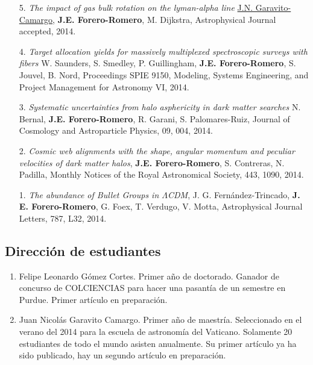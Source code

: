 \documentclass{article}
\begin{document}
\begin{enumerate}
\item[5.]{\it The impact of gas bulk rotation on the lyman-alpha line}
  \underline{J.N. Garavito-Camargo},  {\bf J.E. Forero-Romero}, M. Dijkstra,
  Astrophysical Journal
  accepted, 2014. 

\item[4.]{\it } {\it Target allocation yields for massively
  multiplexed spectroscopic surveys with fibers} W. Saunders,
  S. Smedley, P. Guillingham, {\bf J.E. Forero-Romero}, S. Jouvel,
  B. Nord, Proceedings SPIE 9150, Modeling, Systems Engineering, and
  Project Management for Astronomy VI, 2014.

\item[3.]{\it Systematic uncertainties from halo asphericity in dark
  matter searches}  N. Bernal, {\bf J.E. Forero-Romero}, R. Garani,
  S. Palomares-Ruiz, Journal of Cosmology and Astroparticle Physics,
  09, 004, 2014. 

\item[2.]{\it Cosmic web alignments with the shape, angular momentum
  and peculiar velocities of dark matter halos}, 
  {\bf J.E. Forero-Romero}, S. Contreras, N. Padilla, Monthly Notices
  of the Royal Astronomical Society, 443,
  1090, 2014. 

\item[1.]{\it The abundance of Bullet Groups in $\Lambda$CDM},
  J. G. Fern\'andez-Trincado, {\bf J. E. Forero-Romero}, G. Foex,
  T. Verdugo, V. Motta, Astrophysical Journal Letters, 787, L32, 2014.
\end{enumerate}

\subsection{Direcci\'on de estudiantes}

\begin{enumerate}
\item{Felipe Leonardo G\'omez Cortes. Primer a\~no de doctorado. Ganador
  de concurso de COLCIENCIAS para hacer una pasant\'ia de un semestre en
  Purdue. Primer art\'iculo en preparaci\'on.} 

\item{Juan Nicol\'as Garavito Camargo. Primer a\~no de
  maestr\'ia. Seleccionado en el verano del 2014 para la escuela de
  astronom\'ia del Vaticano. Solamente 20 estudiantes de todo el mundo
asisten anualmente. Su primer art\'iculo ya ha sido publicado, hay un segundo
art\'iculo en preparaci\'on.}
\end{enumerate}
\end{document}
